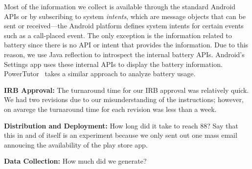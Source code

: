 Most of the information we collect is available through the standard Android
APIs or by subscribing to system {\it intents}, which are message objects that
can be sent or received---the Android platform defines system intents for
certain events such as a call-placed event. The only exception is the
information related to battery since there is no API or intent that provides the
information. Due to this reason, we use Java reflection to introspect the
internal battery APIs. Android's Settings app uses these internal APIs to
display the battery information. PowerTutor~\cite{zhang:codes:2010} takes a
similar approach to analyze battery usage.

{\bf IRB Approval:} The turnaround time for our IRB approval
was relatively quick. We had two revisions due to our misunderstanding of the
instructions; however, on avarege the turnaround time for each revision was less
than a week.

{\bf Distribution and Deployment:} How long did it take to reach 88? Say that
this in and of itself is an experiment because we only sent out one mass email
annoucing the availability of the play store app.

{\bf Data Collection:} How much did we generate?
